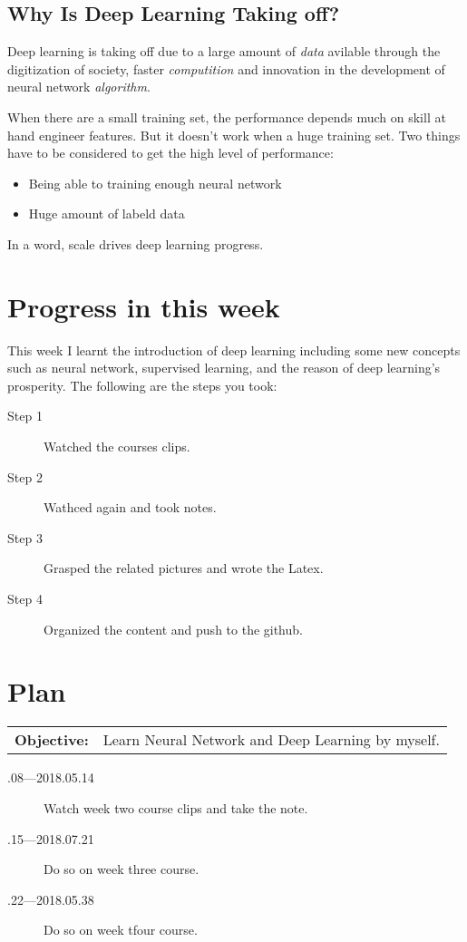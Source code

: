 \documentclass[a4paper]{article}
\begin{document}
\subsection{Why Is Deep Learning Taking off?}
Deep learning is taking off due to a large amount of \emph{data} avilable through the digitization of society, faster \emph{computition} and innovation in the development of neural network \emph{algorithm}.\par
When there are a small training set, the performance depends much on skill at hand engineer features. But it doesn't work when a huge training set. Two things have to be considered to get the high level of performance:
\begin{itemize}
\item Being able to training enough neural network
\item Huge amount of labeld data 
\end{itemize}
In a word, scale drives deep learning progress.


\section{Progress in this week}
This week I learnt the introduction of deep learning including some new concepts such as neural network, supervised learning, and the reason of deep learning's prosperity. The following are the steps you took:
\begin{description}
\item [Step 1]
Watched the courses clips.
\item[Step 2]
Wathced again and took notes.
\item[Step 3]
Grasped the related pictures and wrote the Latex.
\item[Step 4]
Organized the content and push to the github.
\end{description}


\section{Plan}

\begin{tabular}{rl}
	\textbf{Objective:} & Learn Neural Network and Deep Learning by myself. \\
\end{tabular}

\begin{description}
    \item[.08---2018.05.14] Watch week two course clips and take the note.
    \item[.15---2018.07.21] Do so on week three course.
    \item[.22---2018.05.38] Do so on week tfour course.
\end{description}



\end{document}
